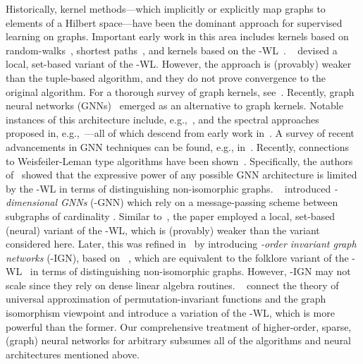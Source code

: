 \documentclass{article}
\theoremstyle{definition}
\newcommand{\wl}{-\textsf{WL}\xspace}
\newcommand{\kwl}{-\textsf{WL}\xspace}
\newcommand{\kgnn}{\textrm{-}\textsf{GNN}\xspace}
\newcommand{\kign}{\textrm{-}\textsf{IGN}\xspace}
\begin{document}
Historically, kernel methods---which implicitly or explicitly map graphs to elements of a Hilbert space---have been the dominant approach for supervised learning on graphs. Important early work in this area includes kernels based on random-walks~\cite{Gae+2003,Kas+2003,Kri+2017b}, shortest paths~\cite{Bor+2005}, and kernels based on the \wl~\cite{She+2011}. \citeauthor{Mor+2017}~\cite{Mor+2017} devised a local, set-based variant of the \kwl. However, the approach is (provably) weaker than the tuple-based algorithm, and they do not prove convergence to the original algorithm. For a thorough survey of graph kernels, see~\cite{Kri+2019}. Recently, graph neural networks (GNNs)~\cite{Gil+2017,Sca+2009} emerged as an alternative to graph kernels. Notable instances of this architecture include, e.g.,~\cite{Duv+2015,Ham+2017,Vel+2018}, and the spectral approaches proposed in, e.g.,~\cite{Bru+2014,Def+2015,Kip+2017,Mon+2017}---all of which descend from early work in~\cite{Kir+1995,Mer+2005,Spe+1997,Sca+2009}. A survey of recent advancements in GNN techniques can be found, e.g., in~\cite{Cha+2020,Wu+2019,Zho+2018}. Recently, connections to Weisfeiler-Leman type algorithms have been shown~\cite{Bar+2020,Che+2019,Gee+2020a,Gee+2020b,Mae+2019,Mar+2019,Mor+2019,Xu+2018b}. Specifically, the authors of~\cite{Mor+2019,Xu+2018b} showed that the expressive power of any possible GNN architecture is limited by the \wl in terms of distinguishing non-isomorphic graphs. \citeauthor{Mor+2019}~\cite{Mor+2019} introduced \emph{-dimensional GNNs} (\kgnn) which rely on a message-passing scheme between subgraphs of cardinality . Similar to~\cite{Mor+2017}, the paper employed a local, set-based (neural) variant of the \kwl, which is (provably) weaker than the variant considered here. Later, this was refined in~\cite{Mar+2019} by introducing \emph{-order invariant graph networks} (\kign), based on \citeauthor{Mar+2019b}~\cite{Mar+2019b}, which are equivalent to the folklore variant of the \kwl~\cite{Gee+2020b,Gro2017} in terms of distinguishing non-isomorphic graphs. However, \kign may not scale since they rely on dense linear algebra routines. \citeauthor{Che+2019}~\cite{Che+2019} connect the theory of universal approximation of permutation-invariant functions and the graph isomorphism viewpoint and introduce a variation of the -\textsf{WL}, which is more powerful than the former. Our comprehensive treatment of higher-order, sparse, (graph) neural networks for arbitrary  subsumes all of the algorithms and neural architectures mentioned above.
\end{document}
